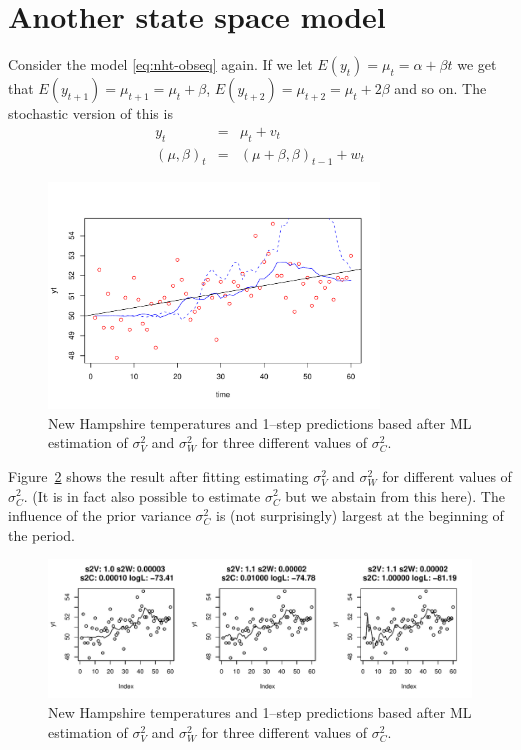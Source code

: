 \section{Another state space model}

Consider the model \eqref{eq:nht-obseq} again. If we let $E(y_t)=\mu_t=\alpha +
\beta t$ we get that $E(y_{t+1})= \mu_{t+1} = \mu_t + \beta$,
$E(y_{t+2})= \mu_{t+2} = \mu_t + 2\beta$ and so on. The stochastic
version of this is
\begin{eqnarray}
  y_t &=& \mu_t + v_t\\
  (\mu,\beta)_t &=& (\mu+\beta,\beta)_{t-1} + w_t
\end{eqnarray}



\begin{figure}[ht]
  \centering
  \includegraphics[height=6cm]{fig/nht-09}
  \caption{New Hampshire temperatures and 1--step  
    predictions based after ML estimation of $\sigma^2_V$ and
    $\sigma^2_W$ for three different values of $\sigma^2_C$. }
  \label{fig:nht09}
\end{figure}



Figure~\ref{fig:nht08} shows the result after fitting estimating 
 $\sigma^2_V$ and $\sigma^2_W$ for different values of
 $\sigma^2_C$. (It is in fact also possible to estimate $\sigma^2_C$
 but we abstain from this here). The influence of the prior variance
$\sigma^2_C$ is (not surprisingly) largest at the beginning of the
period.  

\begin{figure}[ht]
  \centering
  \includegraphics[width=13cm]{fig/nht-08}
  \caption{New Hampshire temperatures and 1--step  
    predictions based after ML estimation of $\sigma^2_V$ and
    $\sigma^2_W$ for three different values of $\sigma^2_C$. }
  \label{fig:nht08}
\end{figure}
